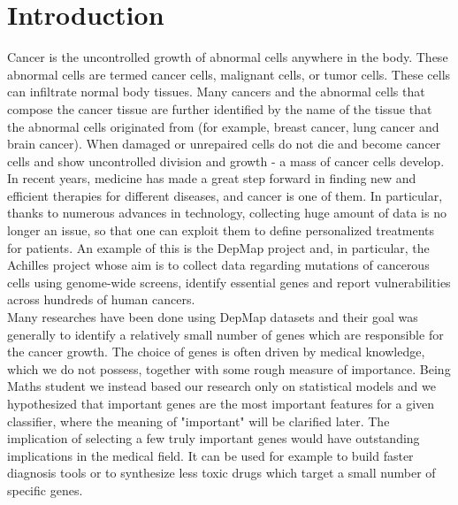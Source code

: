 \documentclass[a4paper,11pt, oneside]{article}  %
\begin{document}
\section{Introduction}
Cancer is the uncontrolled growth of abnormal cells anywhere in the body. These abnormal cells are termed cancer cells, malignant cells, or tumor cells.  These cells can  infiltrate normal body tissues. Many cancers and the abnormal cells that compose the cancer tissue are further identified by  the  name  of  the  tissue  that  the  abnormal  cells  originated  from  (for  example,  breast cancer, lung cancer and brain cancer).  When damaged or unrepaired cells do not die and become cancer cells and show uncontrolled division and growth - a mass of cancer cells develop. 
In recent years, medicine has made a great step forward in finding new and efficient therapies for different diseases,  and cancer is one of them.  In particular,   thanks to numerous advances in technology,  collecting huge amount of data is no longer an issue,  so that one can exploit them to define personalized treatments for patients.  An example of this is the DepMap project and,  in particular,  the Achilles project whose aim is to collect data regarding mutations of cancerous cells using genome-wide screens,  identify essential genes and report vulnerabilities across hundreds of human cancers.  \\
Many researches have been done using DepMap datasets and their goal was generally to identify a relatively small number of genes which are responsible for the cancer growth.  The choice of genes is often driven by medical knowledge,  which we do not possess,  together with some rough measure of importance.  Being Maths student we instead based our research only on statistical models and we hypothesized that important genes are the most important features for a given classifier,  where the meaning of "important" will be clarified later.  The implication of selecting a few truly important genes would have outstanding implications in the medical field.  It can be used for example to build faster diagnosis tools or to synthesize less toxic drugs which target a small number of specific genes. 
\end{document}
